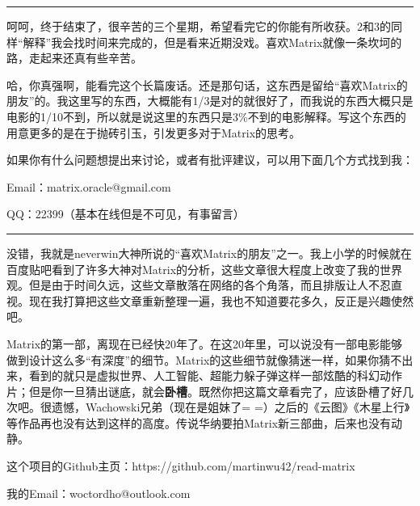 \documentclass[UTF8]{ctexart}
\newcommand{\myparsep}{\noindent \rule[0.5ex]{\linewidth}{1pt}}
\begin{document}
\myparsep

呵呵，终于结束了，很辛苦的三个星期，希望看完它的你能有所收获。2和3的同样“解释”我会找时间来完成的，但是看来近期没戏。喜欢Matrix就像一条坎坷的路，走起来还真有些辛苦。

哈，你真强啊，能看完这个长篇废话。还是那句话，这东西是留给“喜欢Matrix的朋友”的。我这里写的东西，大概能有1/3是对的就很好了，而我说的东西大概只是电影的1/10不到，所以就是说这里的东西只是3\%不到的电影解释。写这个东西的用意更多的是在于抛砖引玉，引发更多对于Matrix的思考。

如果你有什么问题想提出来讨论，或者有批评建议，可以用下面几个方式找到我：

Email：matrix.oracle@gmail.com

QQ：22399（基本在线但是不可见，有事留言）


\myparsep

没错，我就是neverwin大神所说的“喜欢Matrix的朋友”之一。我上小学的时候就在百度贴吧看到了许多大神对Matrix的分析，这些文章很大程度上改变了我的世界观。但是由于时间久远，这些文章散落在网络的各个角落，而且排版让人不忍直视。现在我打算把这些文章重新整理一遍，我也不知道要花多久，反正是兴趣使然吧。

Matrix的第一部，离现在已经快20年了。在这20年里，可以说没有一部电影能够做到设计这么多“有深度”的细节。Matrix的这些细节就像猜迷一样，如果你猜不出来，看到的就只是虚拟世界、人工智能、超能力躲子弹这样一部炫酷的科幻动作片；但是你一旦猜出谜底，就会{\bf 卧槽}。既然你把这篇文章看完了，应该卧槽了好几次吧。很遗憾，Wachowski兄弟（现在是姐妹了= =）之后的《云图》《木星上行》等作品再也没有达到这样的高度。传说华纳要拍Matrix新三部曲，后来也没有动静。

这个项目的Github主页：https://github.com/martinwu42/read-matrix

我的Email：woctordho@outlook.com

\end{document}

